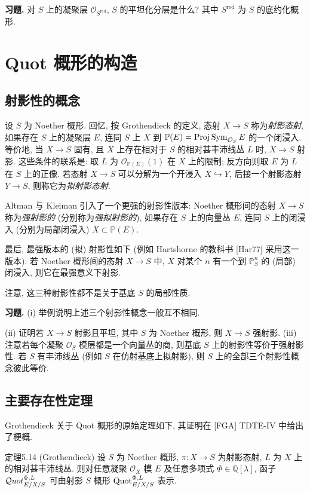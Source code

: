 \textbf{习题.} 对 $S$ 上的凝聚层 $\mathcal O_{S^{\mathrm{red}}}$, $S$ 的平坦化分层是什么? 其中 $S^{\mathrm{red}}$ 为 $S$ 的底约化概形.
\section{Quot 概形的构造}\label{ch05:sec5.5}
\subsection{射影性的概念}\label{ch05:sec5.5.1}
设 $S$ 为 Noether 概形. 回忆, 按 Grothendieck 的定义, 态射 $X\to S$ 称为\emph{射影态射}, 如果存在 $S$ 上的凝聚层 $E$, 连同 $S$ 上 $X$ 到 $\mathbb P(E)=\operatorname{Proj}\operatorname{Sym}_{\mathcal O_S}E$ 的一个闭浸入. 等价地, 当 $X\to S$ 固有, 且 $X$ 上存在相对于 $S$ 的相对甚丰沛线丛 $L$ 时, $X\to S$ 射影. 这些条件的联系是: 取 $L$ 为 $\mathcal O_{\mathbb P(E)}(1)$ 在 $X$ 上的限制; 反方向则取 $E$ 为 $L$ 在 $S$ 上的正像. 若态射 $X\to S$ 可以分解为一个开浸入 $X\hookrightarrow Y$, 后接一个射影态射 $Y\to S$, 则称它为\emph{拟射影态射}.

Altman 与 Kleiman 引入了一个更强的射影性版本: Noether 概形间的态射 $X\to S$ 称为\emph{强射影的} (分别称为\emph{强拟射影的}), 如果存在 $S$ 上的向量丛 $E$, 连同 $S$ 上的闭浸入 (分别为局部闭浸入) $X\subset\mathbb P(E)$.

最后, 最强版本的 (拟) 射影性如下 (例如 Hartshorne 的教科书 [Har77] 采用这一版本): 若 Noether 概形间的态射 $X\to S$ 中, $X$ 对某个 $n$ 有一个到 $\mathbb P^n_S$ 的 (局部) 闭浸入, 则它在最强意义下射影.

注意, 这三种射影性都不是关于基底 $S$ 的局部性质.

\textbf{习题.} (i) 举例说明上述三个射影性概念一般互不相同.

(ii) 证明若 $X\to S$ 射影且平坦, 其中 $S$ 为 Noether 概形, 则 $X\to S$ 强射影.
(iii) 注意若每个凝聚 $\mathcal O_S$ 模层都是一个向量丛的商, 则基底 $S$ 上的射影性等价于强射影性. 若 $S$ 有丰沛线丛 (例如 $S$ 在仿射基底上拟射影), 则 $S$ 上的全部三个射影性概念彼此等价.

\subsection{主要存在性定理}\label{ch05:sec5.5.2}
Grothendieck 关于 Quot 概形的原始定理如下, 其证明在 [FGA] TDTE-IV 中给出了梗概.
\begin{origstatement}{定理}{5.14}\label{ch05:thm5.14}
(Grothendieck) 设 $S$ 为 Noether 概形, $\pi:X\to S$ 为射影态射, $L$ 为 $X$ 上的相对甚丰沛线丛. 则对任意凝聚 $\mathcal O_X$ 模 $E$ 及任意多项式 $\Phi\in\mathbb Q[\lambda]$, 函子 $\mathcal{Q}uot^{\Phi,L}_{E/X/S}$ 可由射影 $S$ 概形 $\operatorname{Quot}^{\Phi,L}_{E/X/S}$ 表示.
\end{origstatement}

